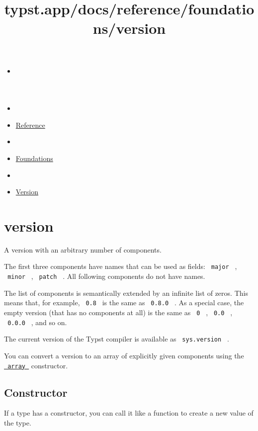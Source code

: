 \title{typst.app/docs/reference/foundations/version}

\begin{itemize}
\tightlist
\item
  \href{/docs}{}
\item
  
\item
  \href{/docs/reference/}{Reference}
\item
  
\item
  \href{/docs/reference/foundations/}{Foundations}
\item
  
\item
  \href{/docs/reference/foundations/version/}{Version}
\end{itemize}

\section{\texorpdfstring{{ version }}{ version }}\label{summary}

A version with an arbitrary number of components.

The first three components have names that can be used as fields:
\texttt{\ major\ } , \texttt{\ minor\ } , \texttt{\ patch\ } . All
following components do not have names.

The list of components is semantically extended by an infinite list of
zeros. This means that, for example, \texttt{\ 0.8\ } is the same as
\texttt{\ 0.8.0\ } . As a special case, the empty version (that has no
components at all) is the same as \texttt{\ 0\ } , \texttt{\ 0.0\ } ,
\texttt{\ 0.0.0\ } , and so on.

The current version of the Typst compiler is available as
\texttt{\ sys.version\ } .

You can convert a version to an array of explicitly given components
using the \href{/docs/reference/foundations/array/}{\texttt{\ array\ }}
constructor.

\subsection{\texorpdfstring{Constructor
{}}{Constructor }}\label{constructor}

\label{constructor-constructor-tooltip}
If a type has a constructor, you can call it like a function to create a
new value of the type.


